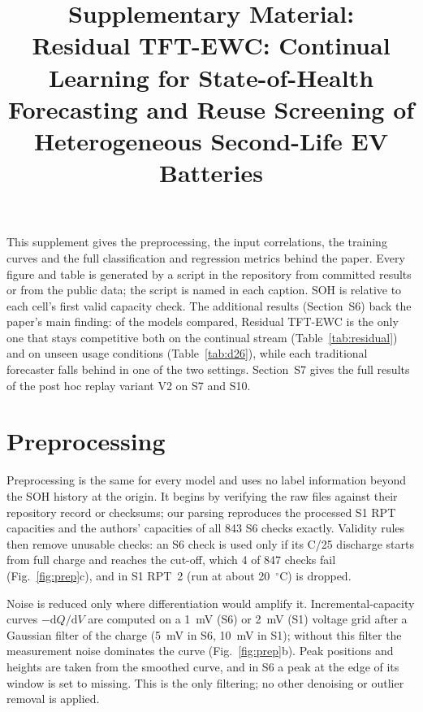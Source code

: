 \documentclass[conference]{IEEEtran}
\begin{document}
\title{Supplementary Material:\\ Residual TFT-EWC: Continual Learning for State-of-Health Forecasting
and Reuse Screening of Heterogeneous Second-Life EV Batteries}
\author{
}
\maketitle

This supplement gives the preprocessing, the input correlations, the training curves and the full classification and
regression metrics behind the paper. Every figure and table is generated by a script in the repository from committed
results or from the public data; the script is named in each caption. SOH is relative to each cell's first valid
capacity check. The additional results (Section~S6) back the paper's main finding: of the models compared, Residual
TFT-EWC is the only one that stays competitive both on the continual stream (Table~\ref{tab:residual}) and on unseen
usage conditions (Table~\ref{tab:d26}), while each traditional forecaster falls behind in one of the two settings. Section~S7 gives the full results of the post hoc replay variant V2 on S7 and S10.

\section{Preprocessing}

Preprocessing is the same for every model and uses no label information beyond the SOH history at the origin. It
begins by verifying the raw files against their repository record or checksums; our parsing reproduces the processed S1
RPT capacities and the authors' capacities of all 843 S6 checks exactly. Validity rules then remove unusable checks: an
S6 check is used only if its C/25 discharge starts from full charge and reaches the cut-off, which 4 of 847 checks fail
(Fig.~\ref{fig:prep}c), and in S1 RPT~2 (run at about 20~$^\circ$C) is dropped.

Noise is reduced only where differentiation would amplify it. Incremental-capacity curves $-\mathrm{d}Q/\mathrm{d}V$ are
computed on a 1~mV (S6) or 2~mV (S1) voltage grid after a Gaussian filter of the charge (5~mV in S6, 10~mV in S1);
without this filter the measurement noise dominates the curve (Fig.~\ref{fig:prep}b). Peak positions and heights are
taken from the smoothed curve, and in S6 a peak at the edge of its window is set to missing. This is the only
filtering; no other denoising or outlier removal is applied.
\end{document}
